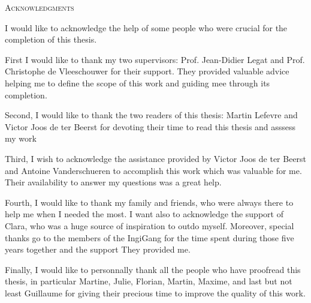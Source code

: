 \vspace*{\fill}
\begin{center}
    \huge{\textsc{Acknowledgments}}
    \end{center}
    
    I would like to acknowledge the help of some people who were crucial for the completion of this thesis.
    
    First I would like to thank my two supervisors: Prof. Jean-Didier Legat and Prof. Christophe de Vleeschouwer for their support. They provided valuable advice helping me to define the scope of this work and guiding mee through its completion.
    
    Second, I would like to thank the two readers of this thesis: Martin Lefevre and Victor Joos de ter Beerst for devoting their time to read this thesis and asssess my work
    
    Third, I wish to acknowledge the assistance provided by Victor Joos de ter Beerst and Antoine Vanderschueren to accomplish this work which was valuable for me. Their availability to answer my questions was a great help.
    
    Fourth, I would like to thank my family and friends, who were always there to help me when I needed the most. I want also to acknowledge the support of Clara, who was a huge source of inspiration to outdo myself. Moreover, special thanks go to the members of the IngiGang for the time spent during those five years together and the support They provided me.
    
    Finally, I would like to personnally thank all the people who have proofread this thesis, in particular Martine, Julie, Florian, Martin, Maxime, and last but not least Guillaume for giving their precious time to improve the quality of this work. 
\vspace*{\fill}
\afterpage{\blankpage}
\newpage
